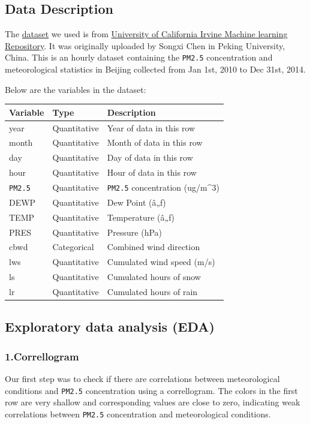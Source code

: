 \documentclass[
]{article}
\begin{document}
\hypertarget{data-description}{%
\subsection{Data Description}\label{data-description}}

The
\href{https://archive.ics.uci.edu/ml/machine-learning-databases/00381/PRSA_data_2010.1.1-2014.12.31.csv}{dataset}
we used is from
\href{https://archive.ics.uci.edu/ml/datasets/Beijing+PM2.5+Data\#}{University
of California Irvine Machine learning Repository}. It was originally
uploaded by Songxi Chen in Peking University, China. This is an hourly
dataset containing the \texttt{PM2.5} concentration and meteorological
statistics in Beijing collected from Jan 1st, 2010 to Dec 31st, 2014.

Below are the variables in the dataset:

\begin{longtable}[]{@{}lll@{}}
\toprule
Variable & Type & Description\tabularnewline
\midrule
\endhead
year & Quantitative & Year of data in this row\tabularnewline
month & Quantitative & Month of data in this row\tabularnewline
day & Quantitative & Day of data in this row\tabularnewline
hour & Quantitative & Hour of data in this row\tabularnewline
\texttt{PM2.5} & Quantitative & \texttt{PM2.5} concentration
(ug/m\^{}3)\tabularnewline
DEWP & Quantitative & Dew Point (â„ƒ)\tabularnewline
TEMP & Quantitative & Temperature (â„ƒ)\tabularnewline
PRES & Quantitative & Pressure (hPa)\tabularnewline
cbwd & Categorical & Combined wind direction\tabularnewline
lws & Quantitative & Cumulated wind speed (m/s)\tabularnewline
ls & Quantitative & Cumulated hours of snow\tabularnewline
lr & Quantitative & Cumulated hours of rain\tabularnewline
\bottomrule
\end{longtable}

\hypertarget{exploratory-data-analysis-eda}{%
\subsection{Exploratory data analysis
(EDA)}\label{exploratory-data-analysis-eda}}

\hypertarget{correllogram}{%
\subsubsection{1.Correllogram}\label{correllogram}}

Our first step was to check if there are correlations between
meteorological conditions and \texttt{PM2.5} concentration using a
correllogram. The colors in the first row are very shallow and
corresponding values are close to zero, indicating weak correlations
between \texttt{PM2.5} concentration and meteorological conditions.
\end{document}
